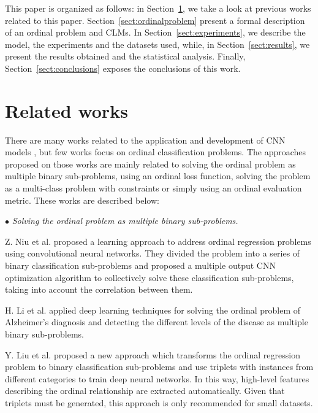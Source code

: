 \documentclass[journal]{IEEEtran}
\begin{document}
	This paper is organized as follows: in Section~\ref{sect:relatedwork}, we take a look at previous works related to this paper. Section~\ref{sect:ordinalproblem} present a formal description of an ordinal problem and CLMs. In Section~\ref{sect:experiments}, we describe the model, the experiments and the datasets used, while, in Section~\ref{sect:results}, we present the results obtained and the statistical analysis. Finally, Section~\ref{sect:conclusions} exposes the conclusions of this work.
	
	\section{Related works}
	\label{sect:relatedwork}
	There are many works related to the application and development of CNN models \cite{liu2017deep}, but few works focus on ordinal classification problems. The approaches proposed on those works are mainly related to 
	solving the ordinal problem as multiple binary sub-problems, using an ordinal loss function, solving the problem as a multi-class problem with constraints or simply using an ordinal evaluation metric. These works are described below:

		
	\vspace{0.2cm}
	$\bullet$ \textit{Solving the ordinal problem as multiple binary sub-problems.}
	
	Z. Niu et al. \cite{niu2016ordinal} proposed a learning approach to address ordinal regression problems using convolutional neural networks. They divided the problem into a series of binary classification sub-problems and proposed a multiple output CNN optimization algorithm to collectively solve these classification sub-problems, taking into account the correlation between them.
	
	H. Li et al. \cite{li2017deep} applied deep learning techniques for solving the ordinal problem of Alzheimer's diagnosis and detecting the different levels of the disease as multiple binary sub-problems.
	
	Y. Liu et al. \cite{liu2017deep} proposed a new approach which transforms the ordinal regression problem to binary classification sub-problems and use triplets with instances from different categories to train deep neural networks. In this way, high-level features describing the ordinal relationship are extracted automatically. Given that triplets must be generated, this approach is only recommended for small datasets.
	
\end{document}
